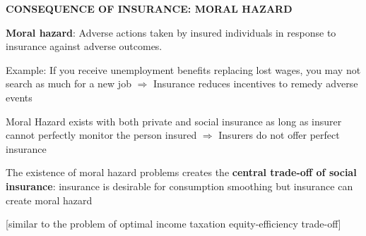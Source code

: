 \documentclass[landscape]{slides}
\begin{document}
%


%
%




\begin{slide}
\begin{center}
{\bf CONSEQUENCE OF INSURANCE: MORAL HAZARD}
\end{center}

{\bf Moral hazard}:
Adverse actions taken by insured individuals in response to insurance against adverse outcomes.

Example: If you receive unemployment benefits replacing lost wages, you may not search as much for a new job $\Rightarrow$ Insurance reduces incentives to remedy adverse events

Moral Hazard exists with both private and social insurance as long as insurer cannot perfectly monitor the person insured $\Rightarrow$ Insurers do not offer perfect insurance

The existence of moral hazard problems creates the \textbf{central trade-off of social insurance}: insurance is
desirable for consumption smoothing but insurance can create moral hazard

[similar to the problem of optimal income taxation equity-efficiency trade-off]
\end{slide}

%
\end{document}
